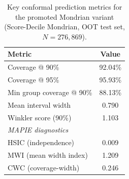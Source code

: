 \begin{table}[t]
\centering
\caption{Key conformal prediction metrics for the promoted Mondrian variant (Score-Decile Mondrian, OOT test set, $N = 276{,}869$).}
\label{tab:key-metrics}
\begin{tabular}{lc}
\toprule
Metric & Value \\
\midrule
Coverage @ 90\% & 92.04\% \\
Coverage @ 95\% & 95.93\% \\
Min group coverage @ 90\% & 88.13\% \\
Mean interval width & 0.790 \\
Winkler score (90\%) & 1.103 \\
\midrule
\multicolumn{2}{l}{\textit{MAPIE diagnostics}} \\
HSIC (independence) & 0.009 \\
MWI (mean width index) & 1.209 \\
CWC (coverage-width) & 0.246 \\
\bottomrule
\end{tabular}
\end{table}
